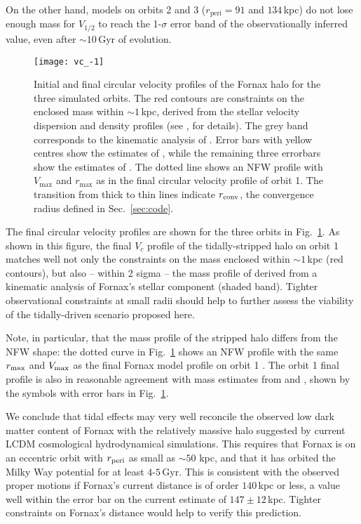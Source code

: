 \documentclass[fleqn,usenatbib]{mnras}
\begin{document}
On the other hand, models on orbits 2 and 3 ($r_\mathrm{peri} = 91$ and $134$\,kpc) do not lose enough mass for $V_{1/2}$ to reach the 1-$\sigma$ error band of the observationally inferred value, even after $\sim 10$\,Gyr of evolution.

\begin{figure}
	\texttt{[image: vc\_-1]}
    \caption{Initial and final circular velocity profiles of the Fornax halo for the three simulated orbits. The red contours are constraints on the enclosed mass within $\sim 1$\,kpc, derived from the stellar velocity dispersion and density profiles (see \citet{Fattahi2016b}, for details). The grey band corresponds to the kinematic analysis of \citet{Read2019}. Error bars with yellow centres show the estimates of \citet{Walker2011}, while the remaining three errorbars show the estimates of \citet{Amorisco2013}. The dotted line shows an NFW profile with $V_\mathrm{max}$ and $r_\mathrm{max}$ as in the final circular velocity profile of orbit 1. The transition from thick to thin lines indicate $r_{\rm conv}$, the convergence radius defined in Sec.~\ref{sec:code}.}
    \label{fig:vc}
\end{figure}

The final circular velocity profiles are shown for the three orbits in Fig.~\ref{fig:vc}. As shown in this figure, the final $V_c$ profile of the tidally-stripped halo on orbit 1 matches well not only the \citet{Fattahi2016b} constraints on the mass enclosed within $\sim 1$\,kpc (red contours), but also -- within 2 sigma -- the mass profile of \citet{Read2019} derived from a kinematic analysis of Fornax’s stellar component (shaded band). Tighter observational constraints at small radii should help to further assess the viability of the tidally-driven scenario proposed here.

Note, in particular, that the mass profile of the stripped halo differs from the NFW shape: the dotted curve in Fig.~\ref{fig:vc} shows an NFW profile with the same $r_{\rm max}$ and $V_{\rm max}$ as the final Fornax model profile on orbit 1 \citep[see; e.g.,][for details]{Errani2021}. The orbit 1 final profile is also in reasonable agreement with mass estimates from \citet{Walker2011} and \citet{Amorisco2013}, shown by the symbols with error bars in Fig.~\ref{fig:vc}.

We conclude that tidal effects may very well reconcile the observed low dark matter content of Fornax with the relatively massive halo suggested by current LCDM cosmological hydrodynamical simulations. This requires that Fornax is on an eccentric orbit with $r_{\rm peri}$ as small as $\sim 50$ kpc, and that it has orbited the Milky Way potential for at least $4$-$5$\,Gyr. This is consistent with the observed proper motions if  Fornax's current distance is of order $140$\,kpc or less, a value well within the error bar on the current estimate of $147\pm 12$\,kpc. Tighter constraints on Fornax's distance would help to verify this prediction. 
\end{document}
